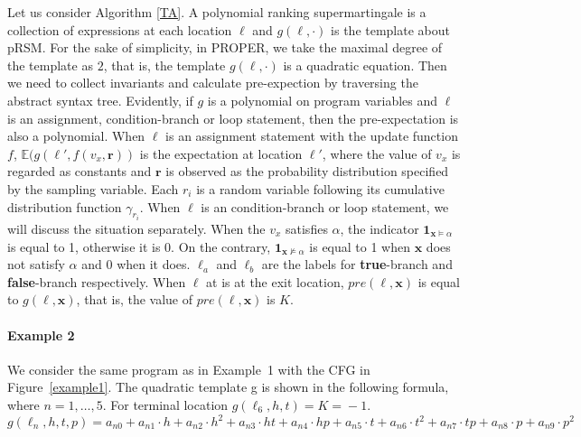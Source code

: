 \documentclass[runningheads]{llncs}
\newcommand\yx[1]{{\color{red} [YD: #1]}}
\begin{document}
Let us consider Algorithm \ref{TA}. A polynomial ranking supermartingale is a collection of expressions at each location $\ell$ and $g(\ell,\cdot)$ is the template about pRSM. For the sake of simplicity, in PROPER, we take the maximal degree of the template as $2$, that is, the template $g(\ell,\cdot)$ is a quadratic equation.
Then we need to collect invariants and calculate pre-expection by traversing the abstract syntax tree. Evidently, if $g$ is a polynomial on program variables and $\ell$ is an assignment, condition-branch or loop statement, then the pre-expectation is also a polynomial. When $\ell$ is an assignment statement with the update function $f$, $\mathbb{E}(g(\ell',f(v_x,\boldsymbol{r}))$ is the expectation at location $\ell'$, where the value of $v_x$ is regarded as constants and $\boldsymbol{r}$ is observed as the probability distribution specified by the sampling variable. Each $r_i$ is a random variable following its cumulative distribution function $\gamma_{r_i}$.
When $\ell$ is an condition-branch or loop statement, we will discuss the situation separately. When the $v_x$ satisfies $\alpha$, the indicator $\textbf{1}_{\boldsymbol{x}\vDash\alpha}$ is equal to 1, otherwise it is 0. On the contrary, $\textbf{1}_{\boldsymbol{x}\nvDash\alpha}$ is equal to 1 when $\boldsymbol{x}$ does not satisfy $\alpha$ and 0 when it does. $\ell_a$ and $\ell_b$ are the labels for \textbf{true}-branch and \textbf{false}-branch respectively. When $\ell$ at is at the exit location,  $pre(\ell,\boldsymbol{x})$ is equal to $g(\ell,\boldsymbol{x})$, that is, the value of $pre(\ell,\boldsymbol{x})$ is $K$.

\paragraph{Example 2} 
We consider the same program as in Example~1 with the CFG in Figure~\ref{example1}. The quadratic template g is shown in the following formula, where $n=1,\ldots,5$. For terminal location $g(\ell_6,h,t)\!=\!K\!=\!-1$. 
$$g(\!\ell_n,h,t,p\!)\!=\!a_{n0}\!+\!a_{n1}\cdot h\!+\!a_{n2}\cdot h^{2}\!+\!a_{n3}\cdot ht \!+\!a_{n4}\cdot hp\!+\!a_{n5}\cdot t\!+\!a_{n6}\cdot t^{2}+\!a_{n7}\cdot tp\!+\!a_{n8}\cdot p\!+\!a_{n9}\cdot p^{2}$$ 
\end{document}

